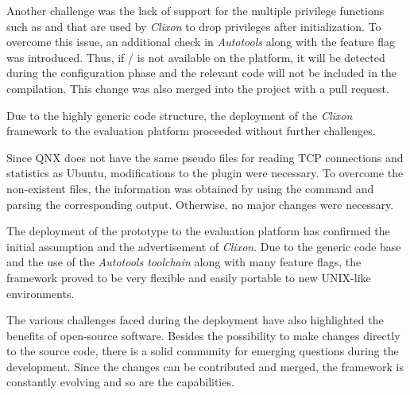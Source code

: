 Another challenge was the lack of support for the multiple privilege functions such as  and  that are used by \textit{Clixon} to drop privileges after initialization. To overcome this issue, an additional check in \textit{Autotools} along with the feature flag  was introduced. Thus, if  /  is not available on the platform, it will be detected during the configuration phase and the relevant code will not be included in the compilation. This change was also merged into the project with a pull request. 

Due to the highly generic code structure, the deployment of the \textit{Clixon} framework to the evaluation platform proceeded without further challenges.

Since QNX does not have the same pseudo files for reading TCP connections and statistics as Ubuntu, modifications to the plugin were necessary. To overcome the non-existent files, the information was obtained by using the  command and parsing the corresponding output. Otherwise, no major changes were necessary.
    
The deployment of the prototype to the evaluation platform has confirmed the initial assumption and the advertisement of \textit{Clixon}. Due to the generic code base and the use of the \textit{Autotools toolchain} along with many feature flags, the framework proved to be very flexible and easily portable to new UNIX-like environments.

The various challenges faced during the deployment have also highlighted the benefits of open-source software. Besides the possibility to make changes directly to the source code, there is a solid community for emerging questions during the development. Since the changes can be contributed and merged, the framework is constantly evolving and so are the capabilities.

% 
